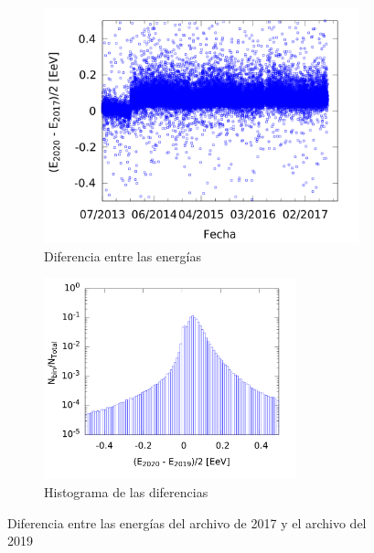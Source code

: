 					\begin{figure}[H]
						\begin{subfigure}[b]{0.5\textwidth}
							\centering
							\includegraphics[width=\textwidth]{../Anisotropia/comparacion_deltaE.png}
							\caption{Diferencia entre las energías} \label{fig:deltaE}
						\end{subfigure}%
						\begin{subfigure}[b]{0.5\textwidth}
							\centering
							\includegraphics[width=0.8\textwidth]{../Anisotropia/histograma_deltaE.png}
							\caption{Histograma de las diferencias} 	\label{fig:histograma}
						\end{subfigure}
						\caption{Diferencia entre las energías del archivo de 2017 y el archivo del 2019}
					\end{figure}

